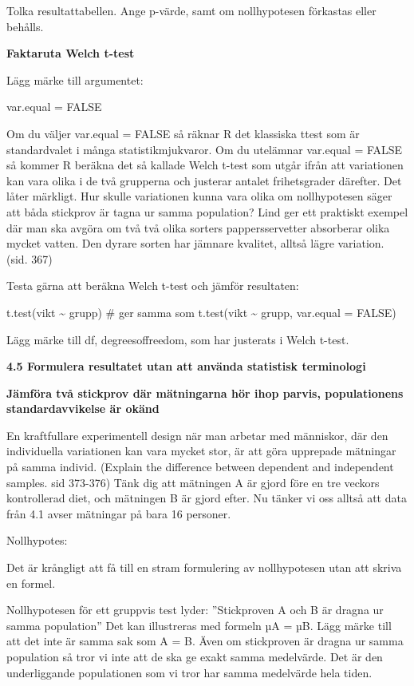 \documentclass[
  letterpaper,
  DIV=11,
  numbers=noendperiod]{scrartcl}
\begin{document}
Tolka resultattabellen. Ange p-värde, samt om nollhypotesen förkastas
eller behålls.

\textbf{Faktaruta Welch t-test}

Lägg märke till argumentet:

var.equal = FALSE

Om du väljer var.equal = FALSE så räknar R det klassiska ttest som är
standardvalet i många statistikmjukvaror. Om du utelämnar var.equal =
FALSE så kommer R beräkna det så kallade Welch t-test som utgår ifrån
att variationen kan vara olika i de två grupperna och justerar antalet
frihetsgrader därefter. Det låter märkligt. Hur skulle variationen kunna
vara olika om nollhypotesen säger att båda stickprov är tagna ur samma
population? Lind ger ett praktiskt exempel där man ska avgöra om två två
olika sorters pappersservetter absorberar olika mycket vatten. Den
dyrare sorten har jämnare kvalitet, alltså lägre variation. (sid. 367)

Testa gärna att beräkna Welch t-test och jämför resultaten:

t.test(vikt \textasciitilde{} grupp) \# ger samma som t.test(vikt
\textasciitilde{} grupp, var.equal = FALSE)

Lägg märke till df, degreesoffreedom, som har justerats i Welch t-test.

\textbf{4.5 Formulera resultatet utan att använda statistisk
terminologi}

\textbf{Jämföra två stickprov där mätningarna hör ihop parvis,
populationens standardavvikelse är okänd}

En kraftfullare experimentell design när man arbetar med människor, där
den individuella variationen kan vara mycket stor, är att göra upprepade
mätningar på samma individ. (Explain the difference between dependent
and independent samples. sid 373-376) Tänk dig att mätningen A är gjord
före en tre veckors kontrollerad diet, och mätningen B är gjord efter.
Nu tänker vi oss alltså att data från 4.1 avser mätningar på bara 16
personer.

Nollhypotes:

Det är krångligt att få till en stram formulering av nollhypotesen utan
att skriva en formel.

Nollhypotesen för ett gruppvis test lyder: ''Stickproven A och B är
dragna ur samma population'' Det kan illustreras med formeln µA = µB.
Lägg märke till att det inte är samma sak som A = B. Även om stickproven
är dragna ur samma population så tror vi inte att de ska ge exakt samma
medelvärde. Det är den underliggande populationen som vi tror har samma
medelvärde hela tiden.
\end{document}
